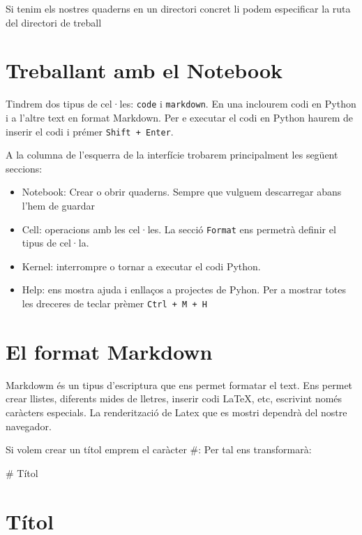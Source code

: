 Si tenim els nostres quaderns en un directori concret li podem especificar la ruta del directori de treball




\section{Treballant amb el Notebook}

Tindrem dos tipus de cel·les: {\tt code} i {\tt markdown}. En una inclourem codi en Python i a l'altre text en format Markdown. Per e executar el codi en Python haurem de inserir el codi i prémer {\tt Shift + Enter}.

A la columna de l'esquerra de la interfície trobarem principalment les següent seccions:

\begin{itemize}
\item Notebook: Crear o obrir quaderns. Sempre que vulguem descarregar abans l'hem de guardar
\item Cell: operacions amb les cel·les. La secció {\tt Format} ens permetrà definir el tipus de cel·la.
\item Kernel: interrompre o tornar a executar el codi Python.
\item Help: ens mostra ajuda i enllaços a projectes de Pyhon. Per a mostrar totes les dreceres de teclar prèmer {\tt Ctrl + M + H}
\end{itemize}



\section{El format Markdown}

Markdowm és un tipus d'escriptura que ens permet formatar el text. Ens permet crear llistes, diferents mides de lletres, inserir codi LaTeX, etc, escrivint només caràcters especials. La renderització de Latex que es mostri dependrà del nostre navegador.

Si volem crear un títol emprem el caràcter \#: Per tal ens transformarà:

\# Títol

\section*{Títol}

